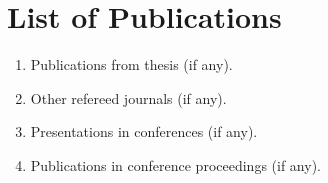 \chapter*{List of Publications}
\thispagestyle{empty}
\begin{enumerate}
    \item Publications from thesis (if any).
    \item Other refereed journals (if any).
    \item Presentations in conferences (if any).
    \item Publications in conference proceedings (if any).
\end{enumerate}
\vfill
